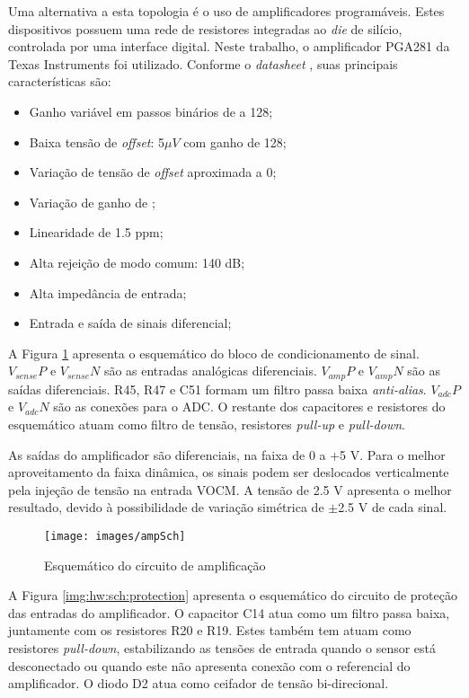 				Uma alternativa a esta topologia é o uso de amplificadores programáveis. Estes dispositivos possuem uma rede de resistores integradas ao \textit{die} de silício, controlada por uma interface digital. Neste trabalho, o amplificador PGA281 da Texas Instruments\textsuperscript{\textregistered} foi utilizado. Conforme o \textit{datasheet} \cite{pga281}, suas principais características são:

				\begin{itemize}
					\item Ganho variável em passos binários de  a 128;
					\item Baixa tensão de \textit{offset}: 5$\mu V$ com ganho de 128;
					\item Variação de tensão de \textit{offset} aproximada a 0;
					\item Variação de ganho de ;
					\item Linearidade de 1.5 ppm;
					\item Alta rejeição de modo comum: 140 dB;
					\item Alta impedância de entrada;
					\item Entrada e saída de sinais diferencial;
				\end{itemize}

				A Figura \ref{img:hw:sch:amp} apresenta o esquemático do bloco de condicionamento de sinal. $V_{sense}P$ e $V_{sense}N$ são as entradas analógicas diferenciais. $V_{amp}P$ e $V_{amp}N$ são as saídas diferenciais. R45, R47 e C51 formam um filtro passa baixa \textit{anti-alias}. $V_{adc}P$ e $V_{adc}N$ são as conexões para o ADC. O restante dos capacitores e resistores do esquemático atuam como filtro de tensão, resistores \textit{pull-up} e \textit{pull-down}.

				As saídas do amplificador são diferenciais, na faixa de 0 a +5 V. Para o melhor aproveitamento da faixa dinâmica, os sinais podem ser deslocados verticalmente pela injeção de tensão na entrada VOCM. A tensão de 2.5 V apresenta o melhor resultado, devido à possibilidade de variação simétrica de $\pm$2.5 V de cada sinal.

				\begin{figure}[h]
					\caption{Esquemático do circuito de amplificação}
					\label{img:hw:sch:amp}
					\texttt{[image: images/ampSch]}
				\end{figure}



				A Figura \ref{img:hw:sch:protection} apresenta o esquemático do circuito de proteção das entradas do amplificador. O capacitor C14 atua como um filtro passa baixa, juntamente com os resistores R20 e R19. Estes também tem atuam como resistores \textit{pull-down}, estabilizando as tensões de entrada quando o sensor está desconectado ou quando este não apresenta conexão com o referencial do amplificador. O diodo D2 atua como ceifador de tensão bi-direcional.


